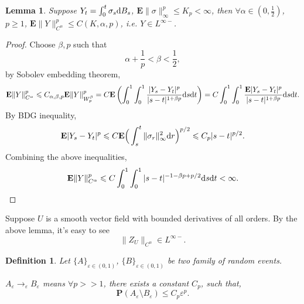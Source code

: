 \documentclass[twoside, 12pt]{book}
\numberwithin{equation}{chapter}
\newtheorem{lemma}[theorem]{Lemma}
\newtheorem{definition}[theorem]{Definition}
\def\bE{{\mathbf E}}
\def\bP{{\mathbf P}}
\def\geq{\geqslant}
\def\leq{\leqslant}
\def\d{\text{\rm{d}}}
\def\eps{\varepsilon}
\begin{document}
	\begin{lemma}
	Suppose $Y_t=\int_0^t \sigma_s\d B_s$, $\bE  \|\sigma\|_\infty^p\leq K_p<\infty$, then $\forall \alpha \in(0,\frac{1}{2})$, $p\geq 1$, $\bE  \|Y\|_{C^\alpha }^p\leq C(K,\alpha ,p)$, i.e. $Y\in L^{\infty-}$. 
	\end{lemma}
	\begin{proof}
		Choose $\beta, p$ such that
		$$\alpha +\frac{1}{p}<\beta<\frac{1}{2},$$
		by Sobolev embedding theorem, 
		$$\bE  \|Y\|^p_{C^\alpha }\leq C_{\alpha ,\beta,p}\bE  \|Y\|^p_{W^\beta_p}=C \bE \left(\int_0^1\int_0^1 \frac{|Y_s-Y_t|^p}{|s-t|^{1+\beta p}}\d s\d t\right)= C\int_0^1\int_0^1 \frac{\bE  |Y_s-Y_t|^p}{|s-t|^{1+\beta p}}\d s\d t. $$
		By BDG inequality, 
		$$\bE  |Y_s-Y_t|^p\leq C \bE \Big(\int_s^t \|\sigma_r\|_\infty^2\d r\Big )^{p/2}\leq C_p|s-t|^{p/2}.$$
		Combining the above inequalities,  
		$$\bE  \|Y\|^p_{C^\alpha }\leq C \int_0^1 \int_0^1  |s-t|^{-1-\beta p+p/2}\d s\d t<\infty. $$
	\end{proof}
	
	Suppose $U$ is a smooth vector field with bounded derivatives of all orders. By the above lemma, it's easy to see
	$$\|Z_U\|_{C^\alpha }\in L^{\infty-}. $$
	
	
	\begin{definition}
	Let $\{A\}_{\eps\in(0,1)}$, $\{B\}_{\eps\in(0,1)}$ be two family of random events. 
	
	$A_\eps \rightarrow_\eps B_\eps$ means $\forall p>>1$, there exists a constant $C_p$, such that, 
	$$\bP (A_\eps\setminus B_\eps)\leq C_p\eps^p. $$
	\end{definition}
	
\end{document}
